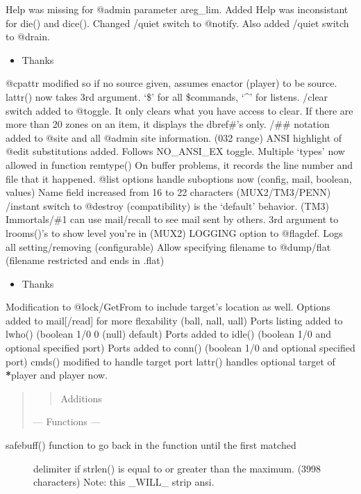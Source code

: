 \documentclass[letterpaper,10pt,english]{sphinxmanual}
\begin{document}
\sphinxAtStartPar
Help was missing for @admin parameter areg\_lim.  \sphinxhyphen{} Added
Help was inconsistant for die() and dice().  \sphinxhyphen{} Changed
/quiet switch to @notify.  Also added /quiet switch to @drain.
\begin{itemize}
\item {} 
\sphinxAtStartPar
Thanks 

\end{itemize}

\sphinxAtStartPar
@cpattr modified so if no source given, assumes enactor (player) to be source.
lattr() now takes 3rd argument. ‘\$’ for all \$commands, ‘\textasciicircum{}’ for listens.
/clear switch added to @toggle.  It only clears what you have access to clear.
If there are more than 20 zones on an item, it displays the dbref\#’s only.
/\#\# notation added to @site and all @admin site information. (0\sphinxhyphen{}32 range)
ANSI highlight of @edit substitutions added.  Follows NO\_ANSI\_EX toggle.
Multiple ‘types’ now allowed in function remtype()
On buffer problems, it records the line number and file that it happened.
@list options handle sub\sphinxhyphen{}options now (config, mail, boolean, values)
Name field increased from 16 to 22 characters (MUX2/TM3/PENN)
/instant switch to @destroy (compatibility) \sphinxhyphen{} is the ‘default’ behavior. (TM3)
Immortals/\#1 can use mail/recall to see mail sent by others.
3rd argument to lrooms()’s to show level you’re in (MUX2)
LOGGING option to @flagdef.  Logs all setting/removing (configurable)
Allow specifying filename to @dump/flat (filename restricted and ends in .flat)
\begin{itemize}
\item {} 
\sphinxAtStartPar
Thanks 

\end{itemize}

\sphinxAtStartPar
Modification to @lock/GetFrom to include target’s location as well.
Options added to mail{[}/read{]} for more flexability (ball, nall, uall)
Ports listing added to lwho() (boolean 1/0 \sphinxhyphen{} 0 (null) default)
Ports added to idle() (boolean 1/0 and optional specified port)
Ports added to conn() (boolean 1/0 and optional specified port)
cmds() modified to handle target port
lattr() handles optional target of {\color{red}\bfseries{}*}player and player now.
\begin{quote}
\begin{quote}

\sphinxAtStartPar
Additions
\end{quote}

\sphinxAtStartPar
— Functions —
\end{quote}
\begin{description}
\item[{safebuff() \sphinxhyphen{} function to go back in the function until the first matched}] \leavevmode
\sphinxAtStartPar
delimiter if strlen() is equal to or greater than the maximum.
(3998 characters) \sphinxhyphen{} Note: this \_WILL\_ strip ansi.

\end{description}
\end{document}
